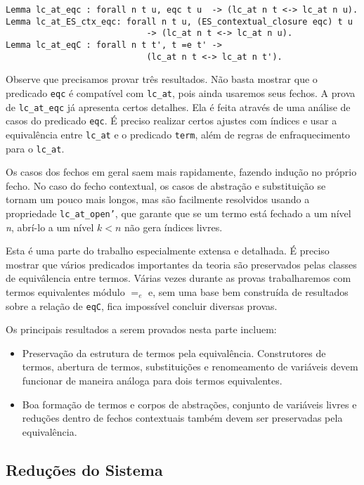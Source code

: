 \begin{lstlisting}[basicstyle=\small]
Lemma lc_at_eqc : forall n t u, eqc t u  -> (lc_at n t <-> lc_at n u).
Lemma lc_at_ES_ctx_eqc: forall n t u, (ES_contextual_closure eqc) t u  
                            -> (lc_at n t <-> lc_at n u).
Lemma lc_at_eqC : forall n t t', t =e t' -> 
                            (lc_at n t <-> lc_at n t').
\end{lstlisting}

Observe que precisamos provar três resultados. Não basta mostrar que o predicado
\texttt{eqc} é compatível com \texttt{lc\_at}, pois ainda usaremos seus fechos.
A prova de \texttt{lc\_at\_eqc} já apresenta certos detalhes. Ela é feita
através de uma análise de casos do predicado \texttt{eqc}. É preciso realizar
certos ajustes com índices e usar a equivalência entre \texttt{lc\_at} e o
predicado \texttt{term}, além de regras de enfraquecimento para o \texttt{lc\_at}.

Os casos dos fechos em geral saem mais rapidamente, fazendo indução no próprio
fecho. No caso do fecho contextual, os casos de abstração e substituição se
tornam um pouco mais longos, mas são facilmente resolvidos usando a propriedade
\texttt{lc\_at\_open'}, que garante que se um termo está fechado a um nível
\emph{n}, abrí-lo a um nível $k < n$ não gera índices livres.

Esta é uma parte do trabalho especialmente extensa e detalhada. É preciso
mostrar que vários predicados importantes da teoria são preservados pelas
classes de equivâlencia entre termos. Várias vezes durante as provas
trabalharemos com termos equivalentes módulo $=_e$ e, sem uma base bem
construída de resultados sobre a relação de \texttt{eqC}, fica impossível
concluir diversas provas.

Os principais resultados a serem provados nesta parte incluem:

\begin{itemize}
    \item Preservação da estrutura de termos pela equivalência. Construtores de
        termos, abertura de termos, substituições e renomeamento de variáveis
        devem funcionar de maneira análoga para dois termos equivalentes.
    \item Boa formação de termos e corpos de abstrações, conjunto de variáveis
        livres e reduções dentro de fechos contextuais também devem ser
        preservadas pela equivalência.
\end{itemize}

\subsection{Reduções do Sistema}
\label{sub:redu_es_do_sistema}

